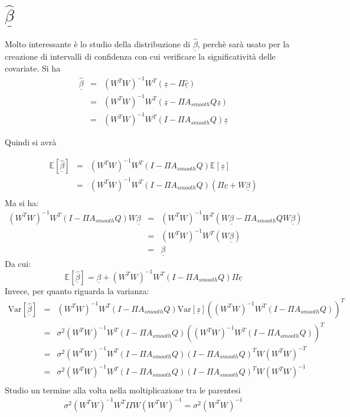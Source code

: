 \documentclass[a4paper,12pt]{report}				%
\begin{document}
\section{$\underline{\hat{\beta}}$}
Molto interessante è lo studio della distribuzione di $\underline{\hat{\beta}}$, perchè sarà usato per la creazione di intervalli di confidenza con cui verificare la significatività delle covariate. Si ha
\begin{eqnarray*}
\underline{\hat{\beta}} &=& (W^TW)^{-1}W^T(\underline{z}-\Pi\underline{\hat{c}}) \\
						&=& (W^TW)^{-1}W^T(\underline{z}-\Pi A_{smooth}Q\underline{z}) \\
						&=& (W^TW)^{-1}W^T(I-\Pi A_{smooth}Q)\underline{z} 
\end{eqnarray*}

Quindi si avrà


\begin{eqnarray*}
\mathbb{E}[\underline{\hat{\beta}}] &=& (W^TW)^{-1}W^T(I-\Pi A_{smooth}Q)\mathbb{E} [\underline{z}] \\
					&=& (W^TW)^{-1}W^T(I-\Pi A_{smooth}Q)(\Pi\underline{c} +W\underline{\beta}) \\
\end{eqnarray*}
Ma si ha:
\begin{eqnarray*}
(W^TW)^{-1}W^T(I-\Pi A_{smooth}Q)W\underline{\beta} &=& (W^TW)^{-1}W^T(W\underline{\beta}-\Pi A_{smooth}QW\underline{\beta}) \\
													&=& (W^TW)^{-1}W^T(W\underline{\beta}) \\
													&=& \underline{\beta}
\end{eqnarray*}
Da cui:
$$
\mathbb{E}[\underline{\hat{\beta}}] = \underline{\beta} + (W^TW)^{-1}W^T(I-\Pi A_{smooth}Q)\Pi\underline{c}
$$
Invece, per quanto riguarda la varianza:
\begin{eqnarray*}
\mathrm{Var}[\underline{\hat{\beta}}] &=&(W^TW)^{-1}W^T(I-\Pi A_{smooth}Q)\mathrm{Var}[\underline{z}]((W^TW)^{-1}W^T(I-\Pi A_{smooth}Q))^T \\
					&=&\sigma^2 (W^TW)^{-1}W^T(I-\Pi A_{smooth}Q)((W^TW)^{-1}W^T(I-\Pi A_{smooth}Q))^T \\
					&=&\sigma^2 (W^TW)^{-1}W^T(I-\Pi A_{smooth}Q)(I-\Pi A_{smooth}Q)^T W(W^TW)^{-T} \\
					&=&\sigma^2 (W^TW)^{-1}W^T(I-\Pi A_{smooth}Q)(I-\Pi A_{smooth}Q)^T W(W^TW)^{-1} \\
\end{eqnarray*}
Studio un termine alla volta nella moltiplicazione tra le parentesi
\begin{eqnarray*}
\sigma^2 (W^TW)^{-1}W^T I I W(W^TW)^{-1} = \sigma^2 (W^TW)^{-1}
\end{eqnarray*}
\end{document}
